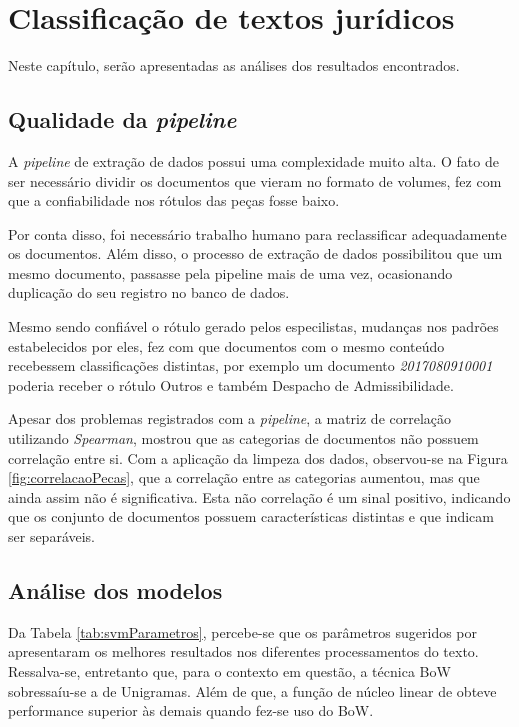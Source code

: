 \chapter[Classificação de textos jurídicos]{Classificação de textos jurídicos}

Neste capítulo, serão apresentadas as análises dos resultados encontrados.

\section{Qualidade da \textit{pipeline}}

A \textit{pipeline} de extração de dados possui uma complexidade muito alta. O fato de ser necessário dividir os documentos que vieram no formato de volumes, fez com que a confiabilidade nos rótulos das peças fosse baixo.

Por conta disso, foi necessário trabalho humano para reclassificar adequadamente os documentos. Além disso, o processo de extração de dados possibilitou que um mesmo documento, passasse pela pipeline mais de uma vez, ocasionando duplicação do seu registro no banco  de dados.

Mesmo sendo confiável o rótulo gerado pelos especilistas, mudanças nos padrões estabelecidos por eles, fez com que documentos com o mesmo conteúdo recebessem classificações distintas, por exemplo um documento \textit{2017080910001} poderia receber o rótulo Outros e também Despacho de Admissibilidade.

Apesar dos problemas registrados com a \textit{pipeline}, a matriz de correlação utilizando \textit{Spearman}, mostrou que as categorias de documentos não possuem correlação entre si. Com a aplicação da limpeza dos dados, observou-se na Figura \ref{fig:correlacaoPecas}, que a correlação entre as categorias aumentou, mas que ainda assim não é significativa. Esta não correlação é um sinal positivo, indicando que os conjunto de documentos possuem características distintas e que indicam ser separáveis.

\section{Análise dos modelos}

Da Tabela \ref{tab:svmParametros}, percebe-se que os parâmetros sugeridos por  apresentaram os melhores resultados nos diferentes processamentos do texto. Ressalva-se, entretanto que, para o contexto em questão, a técnica BoW sobressaíu-se a de Unigramas. Além de que, a função de núcleo linear de \cite{smola_tutorial_2004} obteve performance superior às demais quando fez-se uso do BoW.

